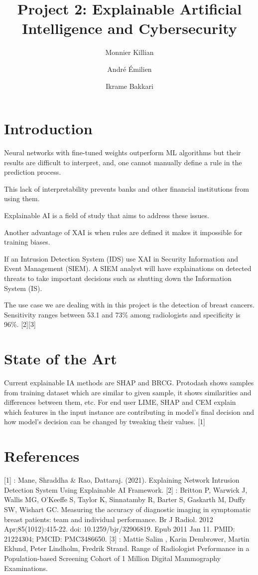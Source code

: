 \documentclass{article}
\author{Monnier Killian\and André Émilien \and Ikrame Bakkari}
\title{Project 2: Explainable Artificial Intelligence and Cybersecurity}
\begin{document}
\maketitle
\section{Introduction}
Neural networks with fine-tuned weights outperform ML algorithms but their results are difficult to interpret, and, one cannot manually define a rule in the prediction process.\par
This lack of interpretability prevents banks and other financial institutions from using them.\par
Explainable AI is a field of study that aims to address these issues.\par
Another advantage of XAI is when rules are defined it makes it impossible for training biases.\par
If an Intrusion Detection System (IDS) use XAI in Security Information and Event Management (SIEM). A SIEM analyst will have explainations on detected threats to take important decisions such as shutting down the Information System (IS).\par
The use case we are dealing with in this project is the detection of breast cancers. Sensitivity ranges between 53.1 and 73\% among radiologists and specificity is 96\%. [2][3]
\section{State of the Art}
Current explainable IA methods are SHAP and BRCG. Protodash shows samples from training dataset which are similar to given sample, it shows similarities and differences between them, etc. For end user LIME, SHAP and CEM explain which features in the input instance are contributing in model's final decision and how model's decision can be changed by tweaking their values. [1]
\section{References}
[1] : Mane, Shraddha \& Rao, Dattaraj. (2021). Explaining Network Intrusion
Detection System Using Explainable AI Framework.
[2] : Britton P, Warwick J, Wallis MG, O'Keeffe S, Taylor K, Sinnatamby R, Barter S, Gaskarth M, Duffy SW, Wishart GC. Measuring the accuracy of diagnostic imaging in symptomatic breast patients: team and individual performance. Br J Radiol. 2012 Apr;85(1012):415-22. doi: 10.1259/bjr/32906819. Epub 2011 Jan 11. PMID: 21224304; PMCID: PMC3486650.
[3] : Mattie Salim , Karin Dembrower, Martin Eklund, Peter Lindholm, Fredrik Strand. Range of Radiologist Performance in a Population-based Screening Cohort of 1 Million Digital Mammography Examinations.
\end{document}
